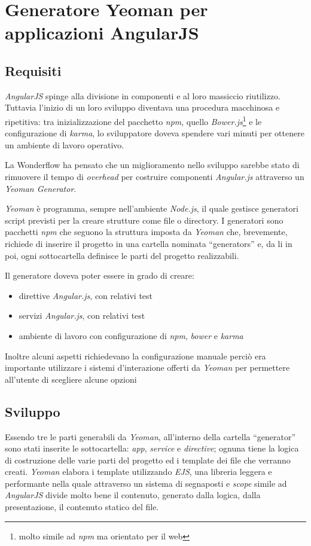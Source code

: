 \section{Generatore Yeoman per applicazioni AngularJS}
\subsection{Requisiti}
\textit{AngularJS} spinge alla divisione in componenti e al loro massiccio
riutilizzo. Tuttavia l'inizio di un loro sviluppo diventava una procedura
macchinosa e ripetitiva: tra inizializzazione del pacchetto \textit{npm},
quello \textit{Bower.js}\footnote{molto simile ad \textit{npm} ma orientato per
il web} e le configurazione di \textit{karma}, lo sviluppatore doveva spendere
 vari minuti per ottenere un ambiente di lavoro operativo.

La Wonderflow ha pensato che un miglioramento nello sviluppo sarebbe stato di
rimuovere il tempo di \textit{overhead} per costruire componenti
\textit{Angular.js} attraverso un \textit{Yeoman Generator}.

\textit{Yeoman} è programma, sempre nell'ambiente \textit{Node.js}, il quale
gestisce generatori script previsti per la creare strutture come file o
directory. I generatori sono pacchetti \textit{npm} che seguono la struttura
imposta da \textit{Yeoman} che, brevemente, richiede di inserire il progetto
in una cartella nominata ``generators'' e, da li in poi, ogni sottocartella
definisce le parti del progetto realizzabili.

Il generatore doveva poter essere in grado di creare:
\begin{itemize}
\item direttive \textit{Angular.js}, con relativi test
\item servizi \textit{Angular.js}, con relativi test
\item ambiente di lavoro con configurazione di \textit{npm}, \textit{bower} e
\textit{karma}
\end{itemize}

Inoltre alcuni aspetti richiedevano la configurazione manuale perciò era
importante utilizzare i sistemi d'interazione offerti da \textit{Yeoman} per
permettere all'utente di scegliere alcune opzioni

\subsection{Sviluppo}
Essendo tre le parti generabili da \textit{Yeoman}, all'interno della cartella
``generator'' sono stati inserite le sottocartella: \textit{app},
\textit{service} e \textit{directive}; ognuna tiene la logica di costruzione
delle varie parti del progetto ed i template dei file che verranno creati.
\textit{Yeoman} elabora i template utilizzando \textit{EJS}, una libreria
leggera e performante nella quale attraverso un sistema di segnaposti e
\textit{scope} simile ad \textit{AngularJS} divide molto bene il contenuto,
generato dalla logica, dalla presentazione, il contenuto statico del file.

